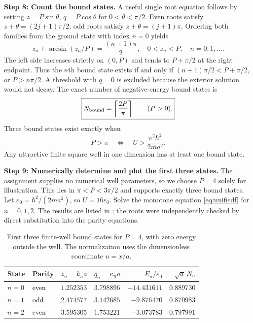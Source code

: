 \documentclass[11pt,a4paper]{article}
\begin{document}
\textbf{Step 8: Count the bound states.} A useful single root equation follows by setting $z=P\sin\theta$, $q=P\cos\theta$ for $0<\theta<\pi/2$. Even roots satisfy $z+\theta=(2j+1)\pi/2$; odd roots satisfy $z+\theta=(j+1)\pi$. Ordering both families from the ground state with index $n=0$ yields
\begin{equation}\label{eq:unifiedf}
\boxed{z_n+\arcsin(z_n/P)=\frac{(n+1)\pi}{2},\quad 0<z_n<P,\quad n=0,1,\ldots.}
\end{equation}
The left side increases strictly on $(0,P)$ and tends to $P+\pi/2$ at the right endpoint. Thus the $n$th bound state exists if and only if $(n+1)\pi/2<P+\pi/2$, or $P>n\pi/2$. A threshold with $q=0$ is excluded because the exterior solution would not decay. The exact number of negative-energy bound states is
\begin{equation}
\boxed{N_{\rm bound}=\left\lceil\frac{2P}{\pi}\right\rceil\qquad(P>0).}
\end{equation}
Three bound states exist exactly when
\begin{equation}
\boxed{P>\pi\quad\Longleftrightarrow\quad U>\frac{\pi^2\hbar^2}{2ma^2}.}
\end{equation}
Any attractive finite square well in one dimension has at least one bound state.

\textbf{Step 9: Numerically determine and plot the first three states.} The assignment supplies no numerical well parameters, so we choose $P=4$ solely for illustration. This lies in $\pi<P<3\pi/2$ and supports exactly three bound states. Let $\varepsilon_0=\hbar^2/(2ma^2)$, so $U=16\varepsilon_0$. Solve the monotone equation \eqref{eq:unifiedf} for $n=0,1,2$. The results are listed in ; the roots were independently checked by direct substitution into the parity equations.
\begin{table}[htbp]\centering
\caption{First three finite-well bound states for $P=4$, with zero energy outside the well. The normalization uses the dimensionless coordinate $u=x/a$.}
\label{tab:finite_roots}
\begin{tabular}{@{}llllrr@{}}\toprule
State & Parity & $z_n=k_na$ & $q_n=\kappa_na$ & $E_n/\varepsilon_0$ & $\sqrt a\,N_n$\\\midrule
$n=0$ & even & $1.252353$ & $3.798896$ & $-14.431611$ & $0.889730$\\
$n=1$ & odd  & $2.474577$ & $3.142685$ & $-9.876470$  & $0.870983$\\
$n=2$ & even & $3.595305$ & $1.753221$ & $-3.073783$  & $0.797991$\\\bottomrule
\end{tabular}
\end{table}
\end{document}

